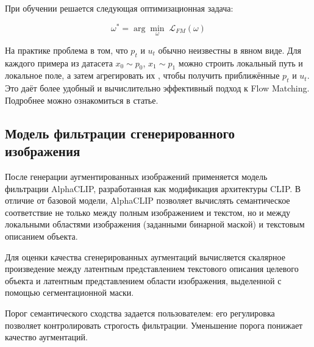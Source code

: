 При обучении решается следующая оптимизационная задача:

\[
\omega^* = \arg\min_{\omega}\;\mathcal{L}_{FM}(\omega)
\]


На практике проблема в том, что \(p_t\) и \(u_t\) обычно неизвестны в явном виде. Для каждого примера из датасета \(x_0\!\sim p_0\), \(x_1\!\sim p_1\) можно строить локальный путь и локальное поле, а затем агрегировать их , чтобы получить приближённые \(p_t\) и \(u_t\). Это даёт более удобный и вычислительно эффективный подход к Flow Matching. Подробнее можно ознакомиться в статье\cite{lipman2023flowmatchinggenerativemodeling}.


\subsection{Модель фильтрации сгенерированного изображения}
После генерации аугментированных изображений применяется модель фильтрации AlphaCLIP\cite{sun2023alphaclipclipmodelfocusing}, разработанная как модификация архитектуры CLIP\cite{DBLP:journals/corr/abs-2103-00020}. В отличие от базовой модели, AlphaCLIP позволяет вычислять семантическое соответствие не только между полным изображением и текстом, но и между локальными областями изображения (заданными бинарной маской) и текстовым описанием объекта.

Для оценки качества сгенерированных аугментаций вычисляется скалярное произведение между латентным представлением текстового описания целевого объекта и латентным представлением области изображения, выделенной с помощью сегментационной маски.

Порог семантического сходства задается пользователем: его регулировка позволяет контролировать строгость фильтрации. Уменьшение порога понижает качество аугментаций.

